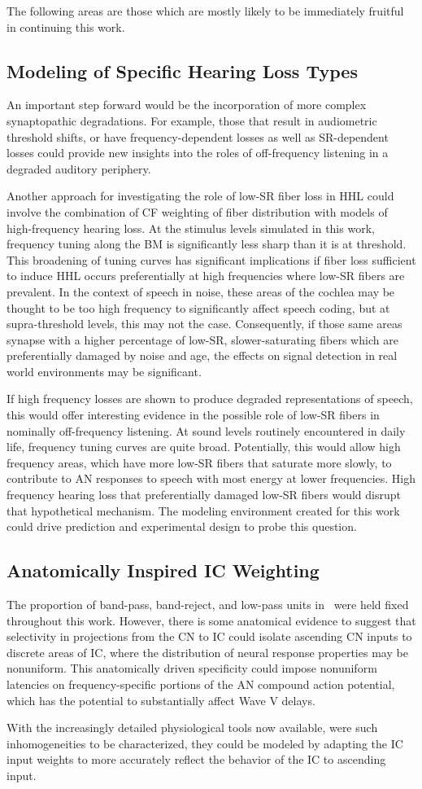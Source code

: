 The following areas are those which are mostly likely to be immediately fruitful in continuing this work.
\label{sec:future_directions}
\subsection{Modeling of Specific Hearing Loss Types} %
\label{sub:modeling_of_specific_hearing_loss_types}
An important step forward would be the incorporation of more complex synaptopathic degradations.  For example, those that result in audiometric threshold shifts, or have frequency-dependent losses as well as SR-dependent losses could provide new insights into the roles of off-frequency listening in a degraded auditory periphery.

Another approach for investigating the role of low-SR fiber loss in HHL could involve the combination of CF weighting of fiber distribution with models of high-frequency hearing loss.  At the stimulus levels simulated in this work, frequency tuning along the BM is significantly less sharp than it is at threshold.  This broadening of tuning curves has significant implications if fiber loss sufficient to induce HHL occurs preferentially at high frequencies where low-SR fibers are prevalent.   In the context of speech in noise, these areas of the cochlea may be thought to be too high frequency to significantly affect speech coding, but at supra-threshold levels, this may not the case. Consequently, if those same areas synapse with a higher percentage of low-SR, slower-saturating fibers which are preferentially damaged by noise and age, the effects on signal detection in real world environments may be significant. 

If high frequency losses are shown to produce degraded representations of speech, this would offer interesting evidence in the possible role of low-SR fibers in nominally off-frequency listening.  At sound levels routinely encountered in daily life, frequency tuning curves are quite broad.  Potentially, this would allow high frequency areas, which have more low-SR fibers that saturate more slowly, to contribute to AN responses to speech with most energy at lower frequencies.  High frequency hearing loss that preferentially damaged low-SR fibers would disrupt that hypothetical mechanism.  The modeling environment created for this work could drive prediction and experimental design to probe this question. 

\subsection{Anatomically Inspired IC Weighting} %
\label{sub:anatomically_inspired_brainstem_adaptation}
The proportion of band-pass, band-reject, and low-pass units in~\cite{Carney2015Speech} were held fixed throughout this work.  However, there is some anatomical evidence to suggest that selectivity in projections from the CN to IC could isolate ascending CN inputs to discrete areas of IC, where the distribution of neural response properties may be nonuniform.  This anatomically driven specificity could impose nonuniform latencies on frequency-specific portions of the AN compound action potential, which has the potential to substantially affect Wave V delays.

With the increasingly detailed physiological tools now available, were such inhomogeneities to be characterized, they could be modeled by adapting the IC input weights to more accurately reflect the behavior of the IC to ascending input. 
